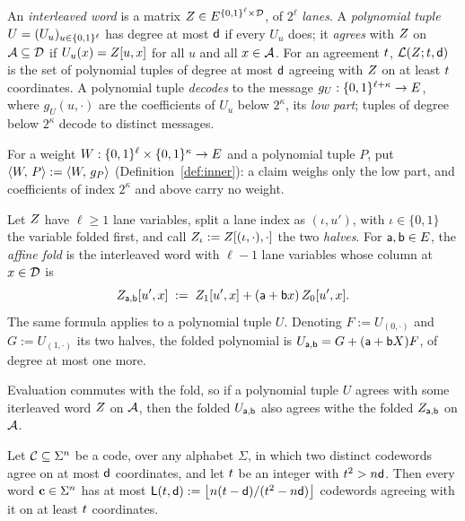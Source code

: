 \begin{definition}\label{def:interleaved}
An \emph{interleaved word} is a matrix $Z \in E^{\{0,1\}^{\ell} \times \mathcal{D}}$, of $2^\ell$ \emph{lanes}. A \emph{polynomial tuple} $U=(U_u)_{u\in\{0,1\}^{\ell}}$ has degree at most $\mathsf{d}$ if every $U_u$ does; it \emph{agrees} with $Z$ on $\mathcal{A}\subseteq\mathcal{D}$ if $U_u(x)=Z[u,x]$ for all $u$ and all $x\in\mathcal{A}$. For an agreement $t$, $\mathcal{L}(Z;t,\mathsf{d})$ is the set of polynomial tuples of degree at most $\mathsf{d}$ agreeing with $Z$ on at least $t$ coordinates. A polynomial tuple \emph{decodes} to the message $g_U:\{0,1\}^{\ell+\kappa}\to E$, where $g_U(u,\cdot)$ are the coefficients of $U_u$ below $2^\kappa$, its \emph{low part}; tuples of degree below $2^\kappa$ decode to distinct messages.
\end{definition}

\begin{definition}\label{def:tuple-claim}
For a weight $W:\{0,1\}^{\ell}\times\{0,1\}^{\kappa}\to E$ and a polynomial tuple $P$, put $\langle W,\, P \rangle:=\langle W,\, g_P \rangle$ (Definition~\ref{def:inner}): a claim weighs only the low part, and coefficients of index $2^\kappa$ and above carry no weight.
\end{definition}

\begin{definition}\label{def:affine-fold}
Let $Z$ have $\ell\ge1$ lane variables, split a lane index as $(\iota,u')$, with $\iota\in\{0,1\}$ the variable folded first, and call $Z_\iota:=Z[(\iota,\cdot),\cdot]$ the two \emph{halves}. For $\mathsf{a},\mathsf{b}\in E$, the \emph{affine fold} is the interleaved word with $\ell-1$ lane variables whose column at $x\in\mathcal{D}$ is
\[
Z_{\mathsf{a},\mathsf{b}}[u',x]\;:=\;Z_1[u',x]+(\mathsf{a}+\mathsf{b} x)\,Z_0[u',x].
\]
The same formula applies to a polynomial tuple $U$. Denoting $F:=U_{(0,\cdot)}$ and $G:=U_{(1,\cdot)}$ its two halves, the folded polynomial is $U_{\mathsf{a},\mathsf{b}} = G+(\mathsf{a}+\mathsf{b} X)F$, of degree at most one more.

Evaluation commutes with the fold, so if a polynomial tuple $U$ agrees with some iterleaved word $Z$ on $\mathcal{A}$, then the folded $U_{\mathsf{a},\mathsf{b}}$ also agrees withe the folded $Z_{\mathsf{a},\mathsf{b}}$ on $\mathcal{A}$.
\end{definition}

\begin{theorem}\label{thm:johnson-general}
Let $\mathcal{C} \subseteq \Sigma^n$ be a code, over any alphabet $\Sigma$, in which two distinct codewords agree on at most $\mathsf{d}$ coordinates, and let $t$ be an integer with $t^2>n\mathsf{d}$. Then every word $\mathbf{c} \in \Sigma^n$ has at most $\mathsf{L}(t,\mathsf{d}):=\bigl\lfloor n(t-\mathsf{d})/(t^2-n\mathsf{d})\bigr\rfloor$ codewords agreeing with it on at least $t$ coordinates.
\end{theorem}

